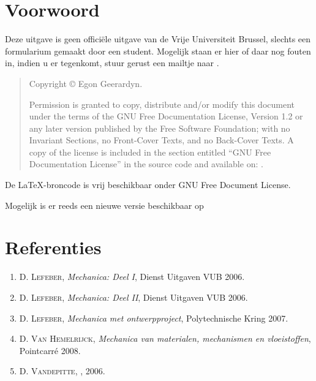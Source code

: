 \section*{Voorwoord}
\label{sec:Voorwoord}
  Deze uitgave is geen officiële uitgave van de Vrije Universiteit Brussel, slechts een formularium gemaakt door een student.
  Mogelijk staan er hier of daar nog fouten in, indien u er tegenkomt,
  stuur gerust een mailtje naar .\par

  \begin{quote}
    Copyright \copyright{}  Egon Geerardyn.\par
    Permission is granted to copy, distribute and/or modify this document
    under the terms of the GNU Free Documentation License, Version 1.2
    or any later version published by the Free Software Foundation;
    with no Invariant Sections, no Front-Cover Texts, and no Back-Cover Texts.
    A copy of the license is included in the section entitled ``GNU
    Free Documentation License'' in the source code and available on:
    .
  \end{quote}
  \noindent
  De \LaTeX -broncode is vrij beschikbaar onder GNU Free Document License. \par


  Mogelijk is er reeds een nieuwe versie beschikbaar op\par
\section*{Referenties}
\begin{enumerate}
	\item \textsc{D. Lefeber}, \textit{Mechanica: Deel I}, Dienst Uitgaven VUB 2006.
	\item \textsc{D. Lefeber}, \textit{Mechanica: Deel II}, Dienst Uitgaven VUB 2006.
        \item \textsc{D. Lefeber}, \textit{Mechanica met ontwerpproject}, Polytechnische Kring 2007.
        \item \textsc{D. Van Hemelrijck}, \textit{Mechanica van materialen, mechanismen en vloeistoffen}, Pointcarré 2008.
	\item \textsc{D. Vandepitte}, , 2006.
\end{enumerate}


